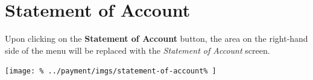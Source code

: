 \documentclass[../main/main]{subfiles}
\begin{document}
\newpage
\section{Statement of Account}
\label{sec:statement-of-account}

Upon clicking on the \textbf{Statement of Account} button,
the area on the right-hand side of the menu will be replaced with the
\emph{Statement of Account} screen.

\texttt{[image: \%
  ../payment/imgs/statement-of-account\%
]}
\end{document}
